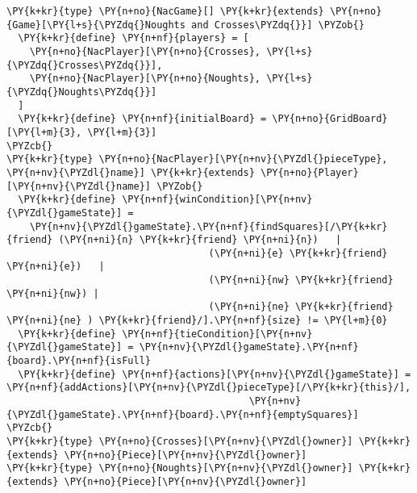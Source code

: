 \begin{Verbatim}[commandchars=\\\{\}]
\PY{k+kr}{type} \PY{n+no}{NacGame}[] \PY{k+kr}{extends} \PY{n+no}{Game}[\PY{l+s}{\PYZdq{}Noughts and Crosses\PYZdq{}}] \PYZob{}
  \PY{k+kr}{define} \PY{n+nf}{players} = [
    \PY{n+no}{NacPlayer}[\PY{n+no}{Crosses}, \PY{l+s}{\PYZdq{}Crosses\PYZdq{}}],
    \PY{n+no}{NacPlayer}[\PY{n+no}{Noughts}, \PY{l+s}{\PYZdq{}Noughts\PYZdq{}}]
  ]
  \PY{k+kr}{define} \PY{n+nf}{initialBoard} = \PY{n+no}{GridBoard}[\PY{l+m}{3}, \PY{l+m}{3}]
\PYZcb{}
\PY{k+kr}{type} \PY{n+no}{NacPlayer}[\PY{n+nv}{\PYZdl{}pieceType}, \PY{n+nv}{\PYZdl{}name}] \PY{k+kr}{extends} \PY{n+no}{Player}[\PY{n+nv}{\PYZdl{}name}] \PYZob{}
  \PY{k+kr}{define} \PY{n+nf}{winCondition}[\PY{n+nv}{\PYZdl{}gameState}] =
    \PY{n+nv}{\PYZdl{}gameState}.\PY{n+nf}{findSquares}[/\PY{k+kr}{friend} (\PY{n+ni}{n} \PY{k+kr}{friend} \PY{n+ni}{n})   |
                                   (\PY{n+ni}{e} \PY{k+kr}{friend} \PY{n+ni}{e})   |
                                   (\PY{n+ni}{nw} \PY{k+kr}{friend} \PY{n+ni}{nw}) |
                                   (\PY{n+ni}{ne} \PY{k+kr}{friend} \PY{n+ni}{ne} ) \PY{k+kr}{friend}/].\PY{n+nf}{size} != \PY{l+m}{0}
  \PY{k+kr}{define} \PY{n+nf}{tieCondition}[\PY{n+nv}{\PYZdl{}gameState}] = \PY{n+nv}{\PYZdl{}gameState}.\PY{n+nf}{board}.\PY{n+nf}{isFull}
  \PY{k+kr}{define} \PY{n+nf}{actions}[\PY{n+nv}{\PYZdl{}gameState}] = \PY{n+nf}{addActions}[\PY{n+nv}{\PYZdl{}pieceType}[/\PY{k+kr}{this}/],
                                          \PY{n+nv}{\PYZdl{}gameState}.\PY{n+nf}{board}.\PY{n+nf}{emptySquares}]
\PYZcb{}
\PY{k+kr}{type} \PY{n+no}{Crosses}[\PY{n+nv}{\PYZdl{}owner}] \PY{k+kr}{extends} \PY{n+no}{Piece}[\PY{n+nv}{\PYZdl{}owner}]
\PY{k+kr}{type} \PY{n+no}{Noughts}[\PY{n+nv}{\PYZdl{}owner}] \PY{k+kr}{extends} \PY{n+no}{Piece}[\PY{n+nv}{\PYZdl{}owner}]
\end{Verbatim}
